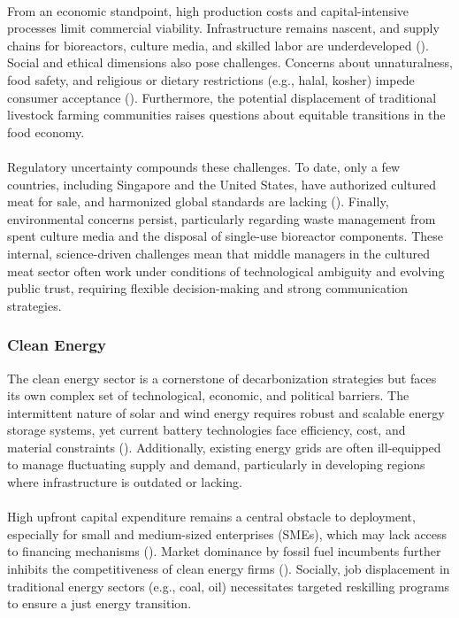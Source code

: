 	\paragraph*{} From an economic standpoint, high production costs and capital-intensive processes limit commercial viability. Infrastructure remains nascent, and supply chains for bioreactors, culture media, and skilled labor are underdeveloped (\textcite{Stephens2018}). Social and ethical dimensions also pose challenges. Concerns about unnaturalness, food safety, and religious or dietary restrictions (e.g., halal, kosher) impede consumer acceptance (\textcite{Bryant2020}). Furthermore, the potential displacement of traditional livestock farming communities raises questions about equitable transitions in the food economy.
	
	\paragraph*{} Regulatory uncertainty compounds these challenges. To date, only a few countries, including Singapore and the United States, have authorized cultured meat for sale, and harmonized global standards are lacking (\textcite{SFA2020, FDA2023}). Finally, environmental concerns persist, particularly regarding waste management from spent culture media and the disposal of single-use bioreactor components. These internal, science-driven challenges mean that middle managers in the cultured meat sector often work under conditions of technological ambiguity and evolving public trust, requiring flexible decision-making and strong communication strategies.
	
	\subsubsection{Clean Energy}
	The clean energy sector is a cornerstone of decarbonization strategies but faces its own complex set of technological, economic, and political barriers. The intermittent nature of solar and wind energy requires robust and scalable energy storage systems, yet current battery technologies face efficiency, cost, and material constraints (\textcite{OECD2022, IEA2021}). Additionally, existing energy grids are often ill-equipped to manage fluctuating supply and demand, particularly in developing regions where infrastructure is outdated or lacking.
	
	\paragraph*{} High upfront capital expenditure remains a central obstacle to deployment, especially for small and medium-sized enterprises (SMEs), which may lack access to financing mechanisms (\textcite{OECD2022}). Market dominance by fossil fuel incumbents further inhibits the competitiveness of clean energy firms (\textcite{IRENA2017}). Socially, job displacement in traditional energy sectors (e.g., coal, oil) necessitates targeted reskilling programs to ensure a just energy transition.
	
